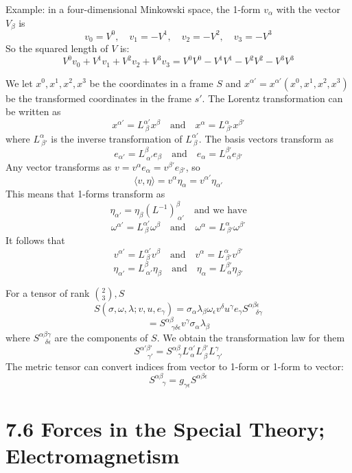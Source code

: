 \documentclass{article}
\begin{document}
    Example: in a four-dimensional Minkowski space, the 1-form $v_\alpha$ with the vector $V_\beta$ is
    $$ v_0 = V^0, \quad v_1 = -V^1, \quad v_2 = -V^2, \quad v_3 = -V^3 $$
    So the squared length of $V$ is:
    $$ V^0 v_0 + V^1 v_1 + V^2 v_2 + V^3 v_3 = V^0 V^0 - V^1 V^1 - V^2 V^2 - V^3 V^3 $$
    
    We let $x^0, x^1, x^2, x^3$ be the coordinates in a frame $S$ and $x^{\alpha'} = x^{\alpha'}(x^0, x^1, x^2, x^3)$ be the transformed coordinates in the frame $s'$. The Lorentz transformation can be written as
    $$ x^{\alpha'} = L^{\alpha'}_{\ \beta} x^\beta \quad \text{and} \quad x^\alpha = L^\alpha_{\ \beta'} x^{\beta'} $$
    where $L^\alpha_{\ \beta'}$ is the inverse transformation of $L^{\alpha'}_{\ \beta}$.
    The basis vectors transform as
    $$ e_{\alpha'} = L^\beta_{\ \alpha'} e_\beta \quad \text{and} \quad e_\alpha = L^{\beta'}_{\ \alpha} e_{\beta'} $$
    Any vector transforms as $v = v^\alpha e_\alpha = v^{\beta'} e_{\beta'}$, so
    $$ \langle v, \eta \rangle = v^\alpha \eta_\alpha = v^{\alpha'} \eta_{\alpha'} $$
    This means that 1-forms transform as
    $$ \eta_{\alpha'} = \eta_\beta (L^{-1})^\beta_{\ \alpha'} \quad \text{and we have} $$
    $$ \omega^{\alpha'} = L^{\alpha'}_{\ \beta} \omega^\beta \quad \text{and} \quad \omega^\alpha = L^\alpha_{\ \beta'} \omega^{\beta'} $$
    It follows that
    $$ v^{\alpha'} = L^{\alpha'}_{\ \beta} v^\beta \quad \text{and} \quad v^\alpha = L^\alpha_{\ \beta'} v^{\beta'} $$
    $$ \eta_{\alpha'} = L^\beta_{\ \alpha'} \eta_\beta \quad \text{and} \quad \eta_\alpha = L^{\beta'}_{\ \alpha} \eta_{\beta'} $$
    
    For a tensor of rank $\binom{2}{3}, S$
    $$ S(\sigma, \omega, \lambda; v, u, e_\gamma) = \sigma_\alpha \lambda_\beta \omega_\epsilon v^\delta u^\gamma e_\gamma S^{\alpha\beta\epsilon}_{\ \ \ \ \ \delta\gamma} $$
    $$ = S^{\alpha\beta}_{\ \ \ \ \gamma\delta\epsilon} v^\gamma \sigma_\alpha \lambda_\beta $$
    where $S^{\alpha\beta\gamma}_{\ \ \ \ \delta\epsilon}$ are the components of $S$.
    We obtain the transformation law for them
    $$ S^{\alpha'\beta'}_{\ \ \ \ \ \gamma'} = S^{\alpha\beta}_{\ \ \ \ \gamma} L^{\alpha'}_{\ \alpha} L^{\beta'}_{\ \beta} L^\gamma_{\ \gamma'} $$
    The metric tensor can convert indices from vector to 1-form or 1-form to vector:
    $$ S^{\alpha\beta}_{\ \ \ \ \ \gamma} = g_{\gamma\epsilon} S^{\alpha\beta\epsilon} $$
    \section*{7.6 Forces in the Special Theory; Electromagnetism}
    
\end{document}

